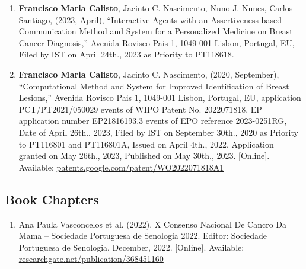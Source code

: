 \begin{enumerate}
\item {\bf Francisco Maria Calisto}, Jacinto C. Nascimento, Nuno J. Nunes, Carlos Santiago, (2023, April), ``Interactive Agents with an Assertiveness-based Communication Method and System for a Personalized Medicine on Breast Cancer Diagnosis,'' Avenida Rovisco Pais 1, 1049-001 Lisbon, Portugal, \acf{EU}, Filed by \acf{IST} on April 24th., 2023 as Priority to PT118618.
\item {\bf Francisco Maria Calisto}, Jacinto C. Nascimento, (2020, September), ``Computational Method and System for Improved Identification of Breast Lesions,'' Avenida Rovisco Pais 1, 1049-001 Lisbon, Portugal, \acf{EU}, application PCT/PT2021/050029 events of \acf{WIPO} Patent No. 2022071818, \acf{EP} application number EP21816193.3 events of \acf{EPO} reference 2023-0251RG, Date of April 26th., 2023, Filed by \acf{IST} on September 30th., 2020 as Priority to PT116801 and PT116801A, Issued on April 4th., 2022, Application granted on May 26th., 2023, Published on May 30th., 2023. [Online]. Available: \href{https://patents.google.com/patent/WO2022071818A1}{patents.google.com/patent/WO2022071818A1}
\end{enumerate}

\subsection{Book Chapters}
\label{sec:chap00100604}

\begin{enumerate}
\item Ana Paula Vasconcelos et al. (2022). X Consenso Nacional De Cancro Da Mama -- Sociedade Portuguesa de Senologia 2022. Editor: Sociedade Portuguesa de Senologia. December, 2022. [Online]. Available: \href{https://www.researchgate.net/publication/368451160}{researchgate.net/publication/368451160}
\end{enumerate}




